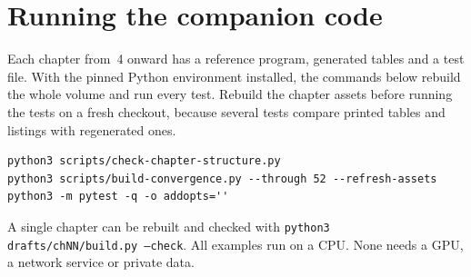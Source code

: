 \section*{Running the companion code}
Each chapter from~4 onward has a reference program, generated tables and a test file. With
the pinned Python environment installed, the commands below rebuild the whole volume and
run every test. Rebuild the chapter assets before running the tests on a fresh checkout,
because several tests compare printed tables and listings with regenerated ones.
\begin{Verbatim}[fontsize=\small]
python3 scripts/check-chapter-structure.py
python3 scripts/build-convergence.py --through 52 --refresh-assets
python3 -m pytest -q -o addopts=''
\end{Verbatim}
A single chapter can be rebuilt and checked with \texttt{python3 drafts/chNN/build.py
--check}. All examples run on a CPU. None needs a GPU, a network service or private data.
